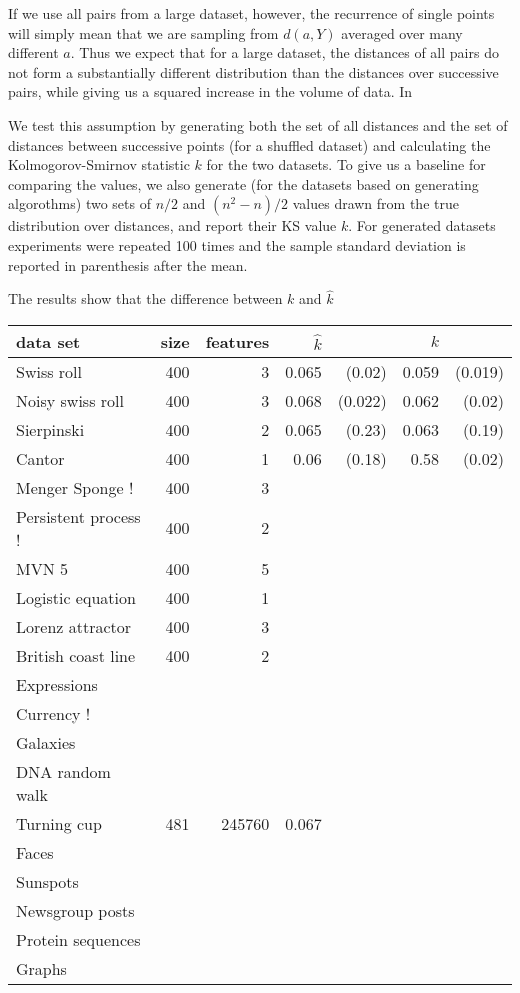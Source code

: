 \documentclass[11pt]{article}
\begin{document}
If we use all pairs from a large dataset, however, the recurrence of single points will simply mean that we are sampling from $d(a, Y)$ averaged over many different $a$. Thus we expect that for a large dataset, the distances of all pairs do not form a substantially different distribution than the distances over successive pairs, while giving us a squared increase in the volume of data. In \cite{}

We test this assumption by generating both the set of all distances and the set of distances between successive points (for a shuffled dataset) and calculating the Kolmogorov-Smirnov statistic $k$ for the two datasets. To give us a baseline for comparing the values, we also generate (for the datasets based on generating algorothms) two sets of $n/2$ and $(n^2 - n)/2$ values drawn from the true distribution over distances, and report their KS value $k$. For generated datasets experiments were repeated 100 times and the sample standard deviation is reported in parenthesis after the mean.

The results show that the difference between $k$ and $\widehat{k}$ 

\begin{tabular}{l | r r r r r r}
\hline
data set & size & features & $\widehat{k}$  & & $k$&  \\
\hline
Swiss roll & 400 & 3 & 0.065 &(0.02) & 0.059&(0.019) \\
Noisy swiss roll & 400 & 3 & 0.068&(0.022)&  0.062&(0.02)\\ 
Sierpinski & 400 & 2 & 0.065&(0.23)& 0.063&(0.19)\\
Cantor & 400 & 1 & 0.06&(0.18) & 0.58&(0.02)\\
Menger Sponge ! & 400 & 3 & & & & \\
Persistent process ! & 400 & 2 & & & & \\
  
MVN 5 & 400 & 5 & & & & \\ 

Logistic equation & 400 & 1 & & & & \\
Lorenz attractor & 400 & 3 & & & & \\
 
British coast line & 400 & 2 & & & & \\   
Expressions & & & & & & \\
Currency ! & & & & & & \\
Galaxies & & & & & & \\
DNA random walk & & & & & & \\
Turning cup & 481 & 245760 & 0.067 & & & \\ 
Faces & & & & & & \\ 
Sunspots & & & & & & \\

Newsgroup posts & & & & & & \\
Protein sequences  & & & & & & \\
Graphs & & & & & & \\
\hline
\end{tabular}
\end{document}
